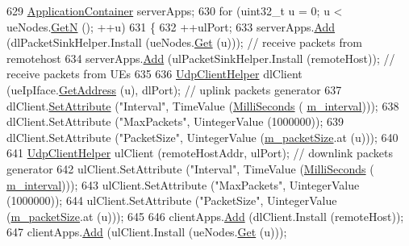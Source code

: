 \begin{DoxyCode}
629   \hyperlink{classns3_1_1ApplicationContainer}{ApplicationContainer} serverApps;
630   \textcolor{keywordflow}{for} (uint32\_t u = 0; u < ueNodes.\hyperlink{classns3_1_1NodeContainer_aed647ac56d0407a7706aba02eb44b951}{GetN} (); ++u)
631     \{
632       ++ulPort;
633       serverApps.\hyperlink{classns3_1_1ApplicationContainer_ad09ab1a1ad5849d518d5f4c262e38152}{Add} (dlPacketSinkHelper.Install (ueNodes.\hyperlink{classns3_1_1NodeContainer_a9ed96e2ecc22e0f5a3d4842eb9bf90bf}{Get} (u))); \textcolor{comment}{// receive packets from
       remotehost}
634       serverApps.\hyperlink{classns3_1_1ApplicationContainer_ad09ab1a1ad5849d518d5f4c262e38152}{Add} (ulPacketSinkHelper.Install (remoteHost));  \textcolor{comment}{// receive packets from UEs}
635 
636       \hyperlink{classns3_1_1UdpClientHelper}{UdpClientHelper} dlClient (ueIpIface.\hyperlink{classns3_1_1Ipv4InterfaceContainer_ae63208dcd222be986822937ee4aa828c}{GetAddress} (u), dlPort); \textcolor{comment}{// uplink
       packets generator}
637       dlClient.\hyperlink{classns3_1_1UdpClientHelper_a8bbae16a28f85ab3f3b5aa4642edfeae}{SetAttribute} (\textcolor{stringliteral}{"Interval"}, TimeValue (\hyperlink{group__timecivil_gaf26127cf4571146b83a92ee18679c7a9}{MilliSeconds} (
      \hyperlink{classLenaPssFfMacSchedulerTestCase2_a80853226f76f2201046d2e6c799680ac}{m\_interval})));
638       dlClient.SetAttribute (\textcolor{stringliteral}{"MaxPackets"}, UintegerValue (1000000));
639       dlClient.SetAttribute (\textcolor{stringliteral}{"PacketSize"}, UintegerValue (\hyperlink{classLenaPssFfMacSchedulerTestCase2_a91fce939c11d7abd86121e57485d8027}{m\_packetSize}.at (u)));
640 
641       \hyperlink{classns3_1_1UdpClientHelper}{UdpClientHelper} ulClient (remoteHostAddr, ulPort);           \textcolor{comment}{// downlink packets
       generator}
642       ulClient.SetAttribute (\textcolor{stringliteral}{"Interval"}, TimeValue (\hyperlink{group__timecivil_gaf26127cf4571146b83a92ee18679c7a9}{MilliSeconds} (
      \hyperlink{classLenaPssFfMacSchedulerTestCase2_a80853226f76f2201046d2e6c799680ac}{m\_interval})));
643       ulClient.SetAttribute (\textcolor{stringliteral}{"MaxPackets"}, UintegerValue (1000000));
644       ulClient.SetAttribute (\textcolor{stringliteral}{"PacketSize"}, UintegerValue (\hyperlink{classLenaPssFfMacSchedulerTestCase2_a91fce939c11d7abd86121e57485d8027}{m\_packetSize}.at (u)));
645 
646       clientApps.\hyperlink{classns3_1_1ApplicationContainer_ad09ab1a1ad5849d518d5f4c262e38152}{Add} (dlClient.Install (remoteHost));
647       clientApps.\hyperlink{classns3_1_1ApplicationContainer_ad09ab1a1ad5849d518d5f4c262e38152}{Add} (ulClient.Install (ueNodes.\hyperlink{classns3_1_1NodeContainer_a9ed96e2ecc22e0f5a3d4842eb9bf90bf}{Get} (u)));

\end{DoxyCode}
